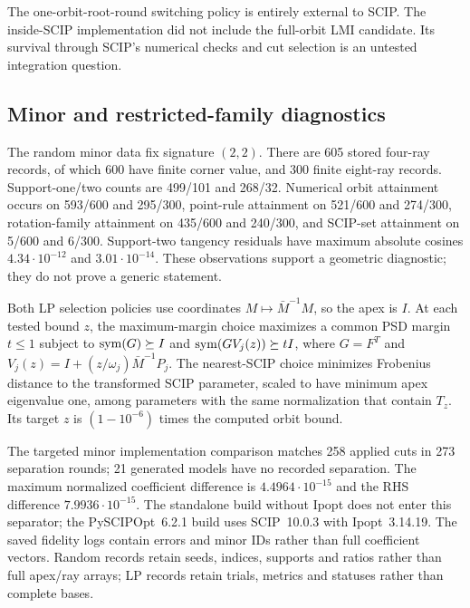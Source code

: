 The one-orbit-root-round switching policy is entirely external to SCIP.
The inside-SCIP implementation did not include the full-orbit LMI
candidate. Its survival through SCIP's numerical checks and cut selection
is an untested integration question.

\subsection{Minor and restricted-family diagnostics}
\label{exp:minor-diagnostics}

The random minor data fix signature $(2, 2)$. There are 605 stored
four-ray records, of which 600 have finite corner value, and 300 finite
eight-ray records. Support-one/two counts are 499/101 and 268/32.
Numerical orbit attainment occurs on 593/600 and 295/300, point-rule
attainment on 521/600 and 274/300, rotation-family attainment on 435/600
and 240/300, and SCIP-set attainment on 5/600 and 6/300. Support-two
tangency residuals have maximum absolute cosines $4.34\cdot 10^{-12}$
and $3.01\cdot 10^{-14}$. These observations support a geometric
diagnostic; they do not prove a generic statement.

Both LP selection policies use coordinates $M\mapsto\bar M^{-1}M$,
so the apex is $I$. At each tested bound $z$, the maximum-margin choice
maximizes a common PSD margin $t\le1$ subject to $\operatorname{sym}(G)\succeq I$
and $\operatorname{sym}(GV_j(z))\succeq tI$, where $G=F^T$ and
$V_j(z)=I+(z/\omega_j)\bar M^{-1}P_j$.
The nearest-SCIP choice minimizes Frobenius distance to the transformed
SCIP parameter, scaled to have minimum apex eigenvalue one, among
parameters with the same normalization that contain $T_z$.
Its target $z$ is $(1-10^{-6})$ times the computed orbit bound.

The targeted minor implementation comparison matches 258 applied cuts
in 273 separation rounds; 21 generated models have no recorded
separation. The maximum normalized coefficient difference is
$4.4964\cdot 10^{-15}$ and the RHS difference $7.9936\cdot 10^{-15}$.
The standalone build without Ipopt does not enter this separator;
the PySCIPOpt~6.2.1 build uses SCIP~10.0.3 with Ipopt~3.14.19.
The saved fidelity logs contain errors and minor IDs rather than full
coefficient vectors. Random records retain seeds, indices, supports and
ratios rather than full apex/ray arrays; LP records retain trials,
metrics and statuses rather than complete bases.

